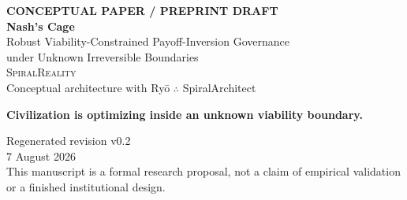 \documentclass[11pt,a4paper]{article}
\numberwithin{equation}{section}
\theoremstyle{definition}
\theoremstyle{plain}
\theoremstyle{remark}
\begin{document}
\hypersetup{pageanchor=false}
\begin{titlepage}
\thispagestyle{empty}
\centering
\vspace*{1.6cm}
{\small\bfseries\color{Moss}\MakeUppercase{Conceptual Paper / Preprint Draft}}\\[1.1cm]
{\fontsize{31}{36}\selectfont\bfseries\color{Forest} Nash's Cage}\\[0.55cm]
{\fontsize{17}{22}\selectfont\color{Earth}
Robust Viability-Constrained Payoff-Inversion Governance\\
under Unknown Irreversible Boundaries}\\[1.6cm]

{\Large\textsc{SpiralReality}}\\[0.35cm]
{\large Conceptual architecture with Ry\={o} $\therefore$ SpiralArchitect}\\[1.5cm]

\begin{tcolorbox}[width=0.84\textwidth,colback=Mist,colframe=Forest,boxrule=0.8pt]
\centering\large\bfseries
Civilization is optimizing inside an unknown viability boundary.
\end{tcolorbox}

\vfill
{\large Regenerated revision v0.2}\\[0.2cm]
{\large 7 August 2026}\\[1cm]
{\small This manuscript is a formal research proposal, not a claim of empirical validation or a finished institutional design.}
\end{titlepage}
\hypersetup{pageanchor=true}
\setcounter{page}{1}
\end{document}
